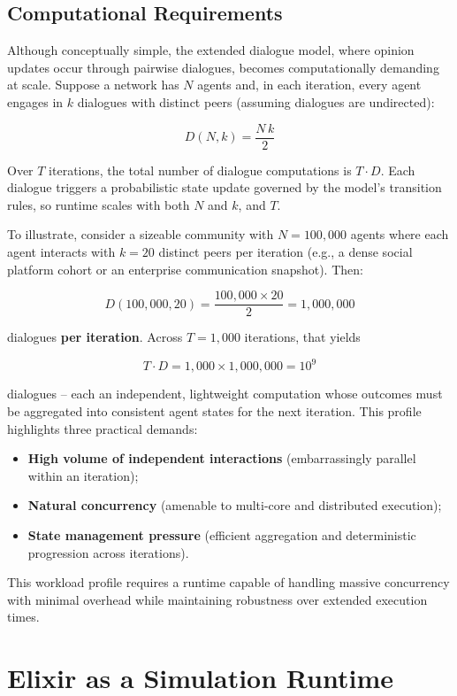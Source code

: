 \documentclass[
]{ceurart}
\begin{document}
\subsection{Computational Requirements}
Although conceptually simple, the extended dialogue model, where opinion updates occur through pairwise dialogues, becomes computationally demanding at scale. Suppose a network has $N$ agents and, in each iteration, every agent engages in $k$ dialogues with distinct peers (assuming dialogues are undirected):

$$
D(N,k)=\frac{N\,k}{2}
$$

Over $T$ iterations, the total number of dialogue computations is $T \cdot D$. Each dialogue triggers a probabilistic state update governed by the model’s transition rules, so runtime scales with both $N$ and $k$, and $T$.

To illustrate, consider a sizeable community with $N=100{,}000$ agents where each agent interacts with $k=20$ distinct peers per iteration (e.g., a dense social platform cohort or an enterprise communication snapshot). Then:

$$
D(100{,}000,20)=\frac{100{,}000 \times 20}{2}=1{,}000{,}000
$$

dialogues \textbf{per iteration}. Across $T=1{,}000$ iterations, that yields

$$T \cdot D=1{,}000 \times 1{,}000{,}000=10^{9}$$

dialogues – each an independent, lightweight computation whose outcomes must be aggregated into consistent agent states for the next iteration. This profile highlights three practical demands:
\begin{itemize}
	\item \textbf{High volume of independent interactions} (embarrassingly parallel within an iteration);
	\item \textbf{Natural concurrency} (amenable to multi-core and distributed execution);
	\item \textbf{State management pressure} (efficient aggregation and deterministic progression across iterations).
\end{itemize}

This workload profile requires a runtime capable of handling massive concurrency with minimal overhead while maintaining robustness over extended execution times.

\section{Elixir as a Simulation Runtime}
\end{document}
